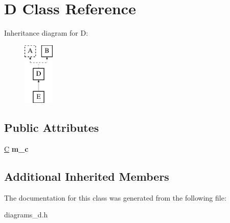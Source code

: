 \hypertarget{classD}{\section{D Class Reference}
\label{classD}
}
Inheritance diagram for D\-:\begin{figure}[H]
\begin{center}
\leavevmode
\includegraphics[height=3.000000cm]{classD}
\end{center}
\end{figure}
\subsection*{Public Attributes}
\begin{DoxyCompactItemize}
\item 
\hypertarget{classD_a9d877c7aa092f423f2a073f3c62fef9c}{\hyperlink{classC}{C} {\bfseries m\-\_\-c}}\label{classD_a9d877c7aa092f423f2a073f3c62fef9c}

\end{DoxyCompactItemize}
\subsection*{Additional Inherited Members}


The documentation for this class was generated from the following file\-:\begin{DoxyCompactItemize}
\item 
diagrams\-\_\-d.\-h\end{DoxyCompactItemize}
